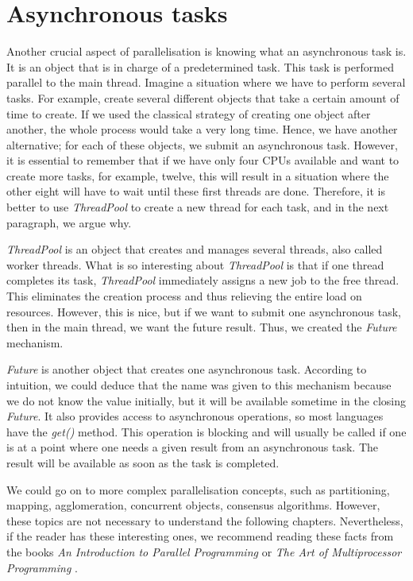 \section{Asynchronous tasks}
\label{04:asynctaks}

Another crucial aspect of parallelisation is knowing what an asynchronous task is. It is an object that is in charge of a predetermined task. This task is performed parallel to the main thread. Imagine a situation where we have to perform several tasks. For example, create several different objects that take a certain amount of time to create. If we used the classical strategy of creating one object after another, the whole process would take a very long time. Hence, we have another alternative; for each of these objects, we submit an asynchronous task. However, it is essential to remember that if we have only four CPUs available and want to create more tasks, for example, twelve, this will result in a situation where the other eight will have to wait until these first threads are done. Therefore, it is better to use \emph{ThreadPool} to create a new thread for each task, and in the next paragraph, we argue why.

\emph{ThreadPool} is an object that creates and manages several threads, also called worker threads. What is so interesting about \emph{ThreadPool} is that if one thread completes its task,
\emph{ThreadPool} immediately assigns a new job to the free thread.  This eliminates the creation process and thus relieving the entire load on resources. However, this is nice, but if we want to submit one asynchronous task, then in the main thread, we want the future result. Thus, we created the \emph{Future} mechanism.

\emph{Future} is another object that creates one asynchronous task. According to intuition, we could deduce that the name was given to this mechanism because we do not know the value initially, but it will be available sometime in the closing \emph{Future}. It also provides access to asynchronous operations, so most languages have the \emph{get()} method. This operation is blocking and will usually be called if one is at a point where one needs a given result from an asynchronous task. The result will be available as soon as the task is completed.

We could go on to more complex parallelisation concepts, such as partitioning, mapping, agglomeration, concurrent objects, consensus algorithms. However, these topics are not necessary to understand the following chapters. Nevertheless, if the reader has these interesting ones, we recommend reading these facts from the books \emph{An Introduction to Parallel Programming} \cite{introductionToParallelProgramming} or \emph{The Art of Multiprocessor Programming} \cite{artOfMultiprocessorProgramming}.
